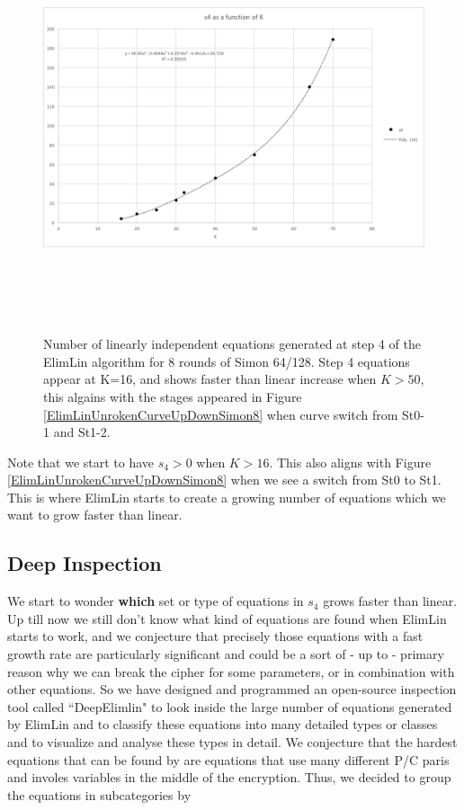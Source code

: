 \begin{figure}[!h]
	\vspace{-0.2cm}
	\centering
	\includegraphics*[width=150mm,height=12cm]{./pics/s4asK.png}
		\caption[Number of linearly independent equations generated at step 4]{Number of linearly independent equations generated at step 4
			of the ElimLin algorithm
			for 8 rounds of Simon 64/128. Step 4 equations appear at K=16, and shows faster than linear increase when $K > 50$, this algains with the stages appeared in Figure  \ref{ElimLinUnrokenCurveUpDownSimon8} when curve switch from St0-1 and St1-2. }
	\label{fig:ElimLinQuadConjExampleSimon8r4}
	\vspace{-0.1cm}
\end{figure}

Note that we start to have $s_4 > 0$ when $K >16$. This also aligns with Figure \ref{ElimLinUnrokenCurveUpDownSimon8} when we see a switch from St0 to St1. 
This is where ElimLin starts to create a growing number of equations which we want to 
grow faster than linear. 
 
\subsection{Deep Inspection}
We start to wonder \textbf{which} set or type of equations in $s_4$ grows faster than linear. 
Up till now we still don't know what kind of equations are found when ElimLin starts to work, and we conjecture that precisely those equations with a fast growth rate are particularly significant and could be a sort of - up to - primary reason why we can break the cipher for some parameters, or in combination with other equations. 
So we have designed and programmed an open-source inspection tool called ``DeepElimlin" \cite{CourtoisSoftware} to look inside the large number of equations generated by ElimLin and to classify these equations into many detailed types or classes and to visualize and analyse these types in detail. We conjecture that the hardest equations that can be found by are equations that use many different P/C paris and involes variables in the middle of the encryption. Thus, we decided to group the equations in subcategories by 

